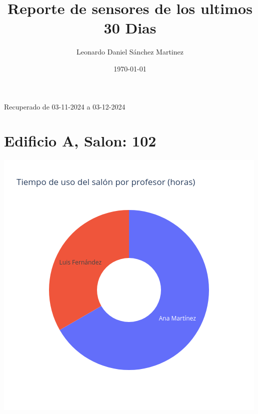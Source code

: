 \documentclass{article}
\title{Reporte de sensores de los ultimos 30 Dias}
\author{Leonardo Daniel Sánchez Martinez}
\date{\today}
\begin{document}
    \maketitle
    Recuperado de 03-11-2024 a 03-12-2024

    \section{Edificio A, Salon: 102}
    \noindent
    \begin{minipage}{0.48\textwidth}
        \centering
        \includegraphics[width=\textwidth]{../img/pie/UP102-30Dias-03-12-2024.png}
    \end{minipage}
    \hfill
\end{document}
